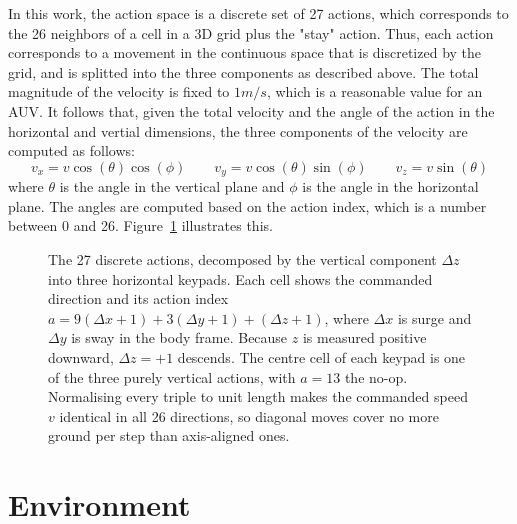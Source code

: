 In this work, the action space is a discrete set of 27 actions, which corresponds to the 26 neighbors of a cell in a 3D grid plus the "stay" action. 
Thus, each action corresponds to a movement in the continuous space that is discretized by the grid, and is splitted into the three components 
as described above. The total magnitude of the velocity is fixed to $1 m/s$, which is a reasonable value for an AUV. It follows that, given the total velocity and the angle of the action in the horizontal and vertial 
dimensions, the three components of the velocity are computed as follows:
\begin{equation}
    v_x = v \cos(\theta) \cos(\phi) \quad\quad
    v_y = v \cos(\theta) \sin(\phi) \quad\quad
    v_z = v \sin(\theta)
\end{equation}
where $\theta$ is the angle in the vertical plane and $\phi$ is the angle in the horizontal plane. The angles are computed based on the action index, which is a number between 0 and 26. Figure~\ref{fig:action-space} illustrates this.

\begin{figure}[t]
    \centering
    
    \caption{The 27 discrete actions, decomposed by the vertical component
    $\Delta z$ into three horizontal keypads. Each cell shows the commanded
    direction and its action index $a = 9(\Delta x + 1) + 3(\Delta y + 1) +
    (\Delta z + 1)$, where $\Delta x$ is surge and $\Delta y$ is sway in the
    body frame. Because $z$ is measured positive downward, $\Delta z = +1$
    descends. The centre cell of each keypad is one of the three purely
    vertical actions, with $a = 13$ the no-op. Normalising every triple to
    unit length makes the commanded speed $v$ identical in all 26 directions,
    so diagonal moves cover no more ground per step than axis-aligned ones.}
    \label{fig:action-space}
\end{figure}

\section{Environment}

